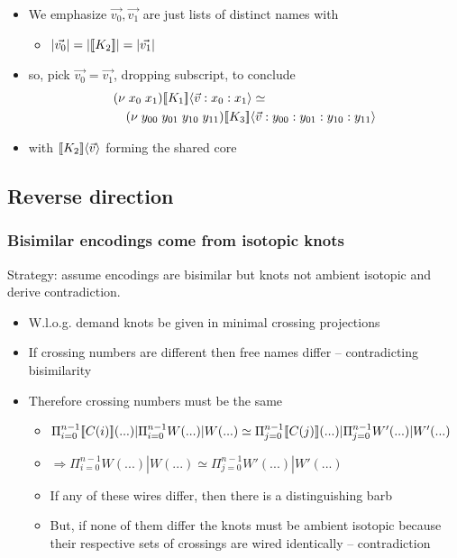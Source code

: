 \documentclass{beamer}
\begin{document}
 \begin{frame}
   \begin{itemize}
     \item We emphasize $\vec{v_0}, \vec{v_1}$ are just lists of distinct names with
       \begin{itemize}
         \item $|\vec{v_0}| = |[\![ K_{2} ]\!]| = |\vec{v_1}|$
       \end{itemize}
     \item so, pick $\vec{v_0} = \vec{v_1}$, dropping subscript, to conclude 
     \begin{eqnarray}
       \lefteqn{(\nu \; x_0 \; x_1)\meaningof{K_{1}}\langle \vec{v}:x_0 : x_1 \rangle \simeq} \nonumber \\
       & & (\nu \; y_{00} \; y_{01} \; y_{10} \; y_{11} )\meaningof{K_{3}}\langle \vec{v}:y_{00} : y_{01} : y_{10} : y_{11} \rangle \nonumber
     \end{eqnarray}
     \item with $[\![ K_{2} ]\!]\langle \vec{v} \rangle$ forming the shared core
   \end{itemize}
 \end{frame}

\subsection{Reverse direction}

\begin{frame}
  \frametitle{Bisimilar encodings come from isotopic knots} Strategy:
  assume encodings are bisimilar but knots not ambient isotopic and
  derive contradiction.
  \begin{itemize}
  \item W.l.o.g. demand knots be given in minimal crossing projections
  \item If crossing numbers are different then free names differ --
    contradicting bisimilarity
  \item Therefore crossing numbers must be the same
  \begin{itemize}
  \item $\Pi_{i=0}^{n-1} [\![ C(i) ]\!](...) | \Pi_{i=0}^{n-1} W(...)|W(...) \simeq \Pi_{j=0}^{n-1} [\![ C(j) ]\!](...) | \Pi_{j=0}^{n-1} W'(...)|W'(...)$
  \item $\Rightarrow \Pi_{i=0}^{n-1} W(...)|W(...) \simeq \Pi_{j=0}^{n-1} W'(...)|W'(...)$
  \item If any of these wires differ, then there is a distinguishing
    barb
  \item But, if none of them differ the knots must be ambient isotopic
    because their respective sets of crossings are wired identically -- contradiction
  \end{itemize}
  \end{itemize}
\end{frame}
\end{document}
